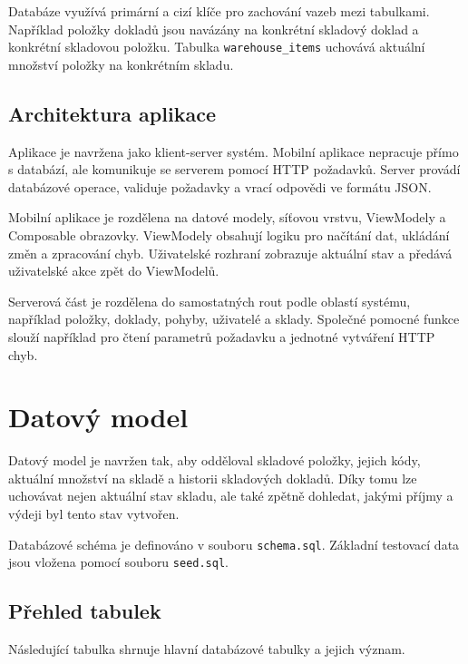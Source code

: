 \documentclass[czech, oth, kiv, he, pdf, viewonly]{fasthesis}
\begin{document}
Databáze využívá primární a cizí klíče pro zachování vazeb mezi
tabulkami. Například položky dokladů jsou navázány na konkrétní
skladový doklad a konkrétní skladovou položku. Tabulka
\texttt{warehouse\_items} uchovává aktuální množství položky na
konkrétním skladu.

\section{Architektura aplikace}

Aplikace je navržena jako klient-server systém. Mobilní aplikace
nepracuje přímo s databází, ale komunikuje se serverem pomocí HTTP
požadavků. Server provádí databázové operace, validuje požadavky
a vrací odpovědi ve formátu JSON.

Mobilní aplikace je rozdělena na datové modely, síťovou vrstvu,
ViewModely a Composable obrazovky. ViewModely obsahují logiku pro
načítání dat, ukládání změn a zpracování chyb. Uživatelské rozhraní
zobrazuje aktuální stav a předává uživatelské akce zpět do ViewModelů.

Serverová část je rozdělena do samostatných rout podle oblastí systému,
například položky, doklady, pohyby, uživatelé a sklady. Společné
pomocné funkce slouží například pro čtení parametrů požadavku a
jednotné vytváření HTTP chyb.

\chapter{Datový model}

Datový model je navržen tak, aby odděloval skladové položky, jejich
kódy, aktuální množství na skladě a historii skladových dokladů.
Díky tomu lze uchovávat nejen aktuální stav skladu, ale také zpětně
dohledat, jakými příjmy a výdeji byl tento stav vytvořen.

Databázové schéma je definováno v souboru \texttt{schema.sql}.
Základní testovací data jsou vložena pomocí souboru \texttt{seed.sql}.

\section{Přehled tabulek}

Následující tabulka shrnuje hlavní databázové tabulky a jejich význam.
\end{document}

